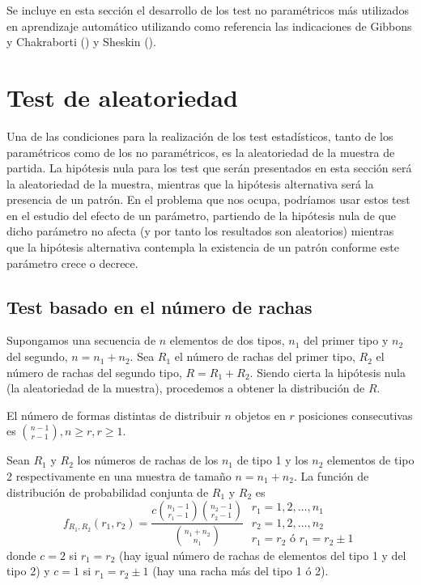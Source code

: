  	Se incluye en esta sección el desarrollo de los test no
paramétricos más utilizados en aprendizaje automático 
utilizando como referencia las indicaciones de Gibbons y 
Chakraborti (\cite{DBLP:reference/stat/GibbonsC11}) y Sheskin 
(\cite{sheskin2003handbook}).
 	
 	
\section{Test de aleatoriedad}

	Una de las condiciones para la realización de los test 
estadísticos, tanto de los paramétricos como de los no 
paramétricos, es la aleatoriedad de la muestra de partida. La 
hipótesis nula para los test que serán presentados en esta 
sección será la aleatoriedad de la muestra, mientras que la 
hipótesis alternativa será la presencia de un patrón. 
En el problema que nos ocupa, podríamos usar estos test 
en el estudio del efecto de un parámetro, partiendo de la
hipótesis nula de que dicho parámetro no afecta (y por tanto
los resultados son aleatorios) mientras que la hipótesis
alternativa contempla la existencia de un patrón conforme
este parámetro crece o decrece.

\subsection{Test basado en el número de rachas}

	Supongamos una secuencia de $n$ elementos de dos tipos, 
$n_1$ del primer tipo y $n_2$ del segundo, $n = n_1 + n_2$. 
Sea $R_1$ el número de rachas del primer tipo, $R_2$ el 
número de rachas del segundo tipo, $R = R_1 + R_2$. Siendo 
cierta la hipótesis nula (la aleatoriedad de la muestra), 
procedemos a obtener la distribución de $R$.
	
\begin{lema} 
	El número de formas distintas de distribuir $n$ objetos 
en $r$ posiciones consecutivas es ${n-1 \choose r-1}, n \geq 
r, r \geq 1$.
\end{lema}

\begin{teorema}
	Sean $R_1$ y $R_2$ los números de rachas de los $n_1$ de 
tipo 1 y los $n_2$ elementos de tipo 2 respectivamente en una 
muestra de tamaño $n = n_1 + n_2$. La función de distribución 
de probabilidad conjunta de $R_1$ y $R_2$ es
	\[ f_{R_1,R_2} (r_1, r_2) = 
		\frac{c {n_1 - 1 \choose r_1 - 1} 
				{n_2 - 1 \choose r_2 - 1}}
			{{n_1 + n_2 \choose n_1}}\;
		\begin{array}{l}
			r_1 = 1,2, \dots, n_1 \\
			r_2 = 1,2, \dots, n_2 \\
			r_1 = r_2 \text{ ó } r_1 = r_2 \pm 1
		\end{array}
	\]
	donde $c=2$ si $r_1 = r_2$ (hay igual número de rachas de 
elementos del tipo 1 y del tipo 2) y $c=1$ si $r_1 = 
r_2 \pm 1$ (hay una racha más del tipo 1 ó 2).
\end{teorema}

